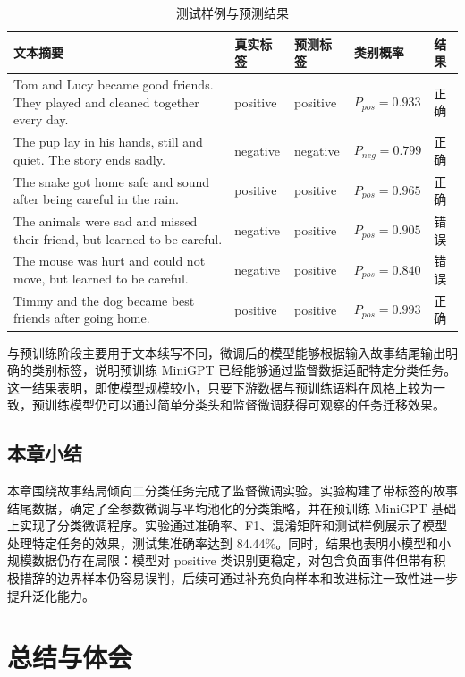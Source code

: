 \documentclass[UTF8,a4paper,zihao=-4,fontset=none]{ctexart}
\numberwithin{equation}{section}
\begin{document}
\begin{table}[H]
  \centering
  \caption{测试样例与预测结果}
  \label{tab:finetune_samples}
  \begin{tabular}{L{6.2cm}L{1.8cm}L{1.8cm}L{2.4cm}L{2.0cm}}
    \toprule
    文本摘要 & 真实标签 & 预测标签 & 类别概率 & 结果 \\
    \midrule
    Tom and Lucy became good friends. They played and cleaned together every day. & positive & positive & $P_{pos}=0.933$ & 正确 \\
    The pup lay in his hands, still and quiet. The story ends sadly. & negative & negative & $P_{neg}=0.799$ & 正确 \\
    The snake got home safe and sound after being careful in the rain. & positive & positive & $P_{pos}=0.965$ & 正确 \\
    The animals were sad and missed their friend, but learned to be careful. & negative & positive & $P_{pos}=0.905$ & 错误 \\
    The mouse was hurt and could not move, but learned to be careful. & negative & positive & $P_{pos}=0.840$ & 错误 \\
    Timmy and the dog became best friends after going home. & positive & positive & $P_{pos}=0.993$ & 正确 \\
    \bottomrule
  \end{tabular}
\end{table}

与预训练阶段主要用于文本续写不同，微调后的模型能够根据输入故事结尾输出明确的类别标签，说明预训练 MiniGPT 已经能够通过监督数据适配特定分类任务。这一结果表明，即使模型规模较小，只要下游数据与预训练语料在风格上较为一致，预训练模型仍可以通过简单分类头和监督微调获得可观察的任务迁移效果。

\subsection{本章小结}

本章围绕故事结局倾向二分类任务完成了监督微调实验。实验构建了带标签的故事结尾数据，确定了全参数微调与平均池化的分类策略，并在预训练 MiniGPT 基础上实现了分类微调程序。实验通过准确率、F1、混淆矩阵和测试样例展示了模型处理特定任务的效果，测试集准确率达到 84.44\%。同时，结果也表明小模型和小规模数据仍存在局限：模型对 positive 类识别更稳定，对包含负面事件但带有积极措辞的边界样本仍容易误判，后续可通过补充负向样本和改进标注一致性进一步提升泛化能力。

\section{总结与体会}
\end{document}
